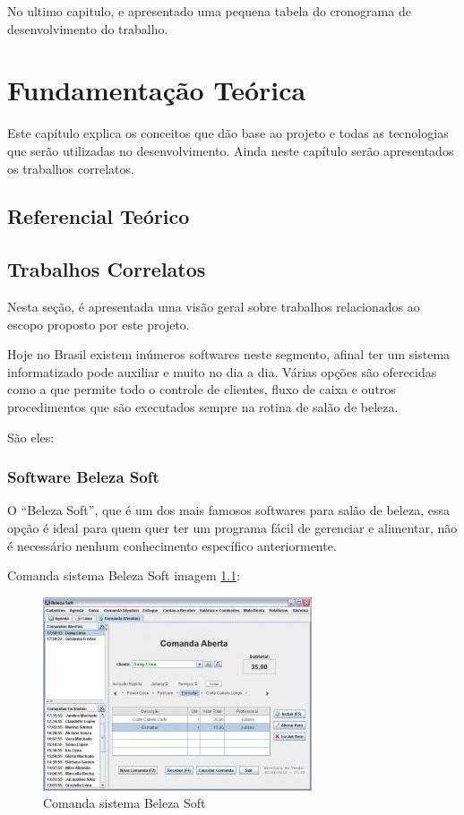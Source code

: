 \documentclass{automatextcc}
\begin{document}
No ultimo capitulo, e apresentado uma pequena tabela do cronograma de desenvolvimento do trabalho.


\chapter{Fundamentação Teórica}

Este capítulo explica os conceitos que dão base ao projeto e todas as tecnologias que serão utilizadas no desenvolvimento. Ainda neste capítulo serão apresentados os trabalhos correlatos.


\section{Referencial Teórico}


\section{Trabalhos Correlatos}

Nesta seção, é apresentada uma visão geral sobre trabalhos relacionados ao escopo proposto por este projeto.

Hoje no Brasil existem inúmeros softwares neste segmento, afinal ter um sistema informatizado pode auxiliar e muito no dia a dia. Várias opções são oferecidas como a que permite todo o controle de clientes, fluxo de caixa e outros procedimentos que são executados sempre na rotina de salão de beleza.

São eles:

\subsection{Software Beleza Soft}

O “Beleza Soft”, que é um dos mais famosos softwares para salão de beleza, essa opção é ideal para quem quer ter um programa fácil de gerenciar e alimentar, não é necessário nenhum conhecimento específico anteriormente.

   Comanda sistema Beleza Soft imagem \ref{img4}: 
 \begin{figure}[h!]
    \centering
	\includegraphics[scale=1]{comanda}
	\caption{Comanda sistema Beleza Soft}
	\label{img4}
\end{figure}
\end{document}
